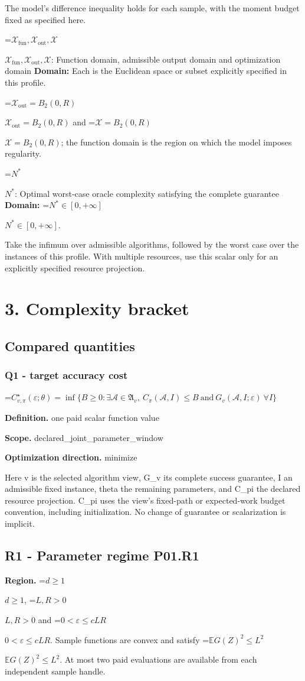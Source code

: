 \documentclass[10pt,a4paper]{article}
\newcommand{\AtlasMath}[1]{\par\begingroup\centering\setbox0=\hbox{$\displaystyle #1$}\ifdim\wd0>1.4\linewidth\typeout{ATLAS WIDE FORMULA: \the\wd0}\fi\ifdim\wd0>\linewidth\resizebox{\linewidth}{!}{\box0}\else\box0\fi\par\endgroup}
\newcommand{\AtlasInlineMath}[1]{\begingroup\setbox0=\hbox{$#1$}\ifdim\wd0>.4\linewidth\endgroup\AtlasMath{#1}\else\endgroup$#1$\fi}
\begin{document}
The model's difference inequality holds for each sample, with the moment budget fixed as specified here.

\AtlasInlineMath{\mathcal{X}_{\mathrm{fun}},\mathcal{X}_{\mathrm{out}},\mathcal{X}}: Function domain, admissible output domain and optimization domain \textbf{Domain:} Each is the Euclidean space or subset explicitly specified in this profile.

\AtlasInlineMath{\mathcal{X}_{\mathrm{out}}=B_2(0,R)} and \AtlasInlineMath{\mathcal{X}=B_2(0,R)}; the function domain is the region on which the model imposes regularity.

\AtlasInlineMath{N^*}: Optimal worst-case oracle complexity satisfying the complete guarantee \textbf{Domain:} \AtlasInlineMath{N^*\in[0,+\infty]}.

Take the infimum over admissible algorithms, followed by the worst case over the instances of this profile. With multiple resources, use this scalar only for an explicitly specified resource projection.

\section{3. Complexity bracket}
\subsection{Compared quantities}
\subsubsection{Q1 - target accuracy cost}
\AtlasMath{C^\star_{v,\pi}(\varepsilon;\theta)=\inf\{B\ge0:\exists\mathcal A\in\mathfrak A_v,\ C_\pi(\mathcal A,I)\le B\ \text{and}\ G_v(\mathcal A,I;\varepsilon)\ \forall I\}}
\textbf{Definition.} one paid scalar function value

\textbf{Scope.} declared\_joint\_parameter\_window

\textbf{Optimization direction.} minimize

Here v is the selected algorithm view, G\_v its complete success guarantee, I an admissible fixed instance, theta the remaining parameters, and C\_pi the declared resource projection. C\_pi uses the view's fixed-path or expected-work budget convention, including initialization. No change of guarantee or scalarization is implicit.

\subsection{R1 - Parameter regime P01.R1}
\textbf{Region.} \AtlasInlineMath{d\ge1}, \AtlasInlineMath{L,R>0} and \AtlasInlineMath{0<\varepsilon\le cLR}. Sample functions are convex and satisfy \AtlasInlineMath{\mathbb{E}G(Z)^2\le L^2}. At most two paid evaluations are available from each independent sample handle.
\end{document}
